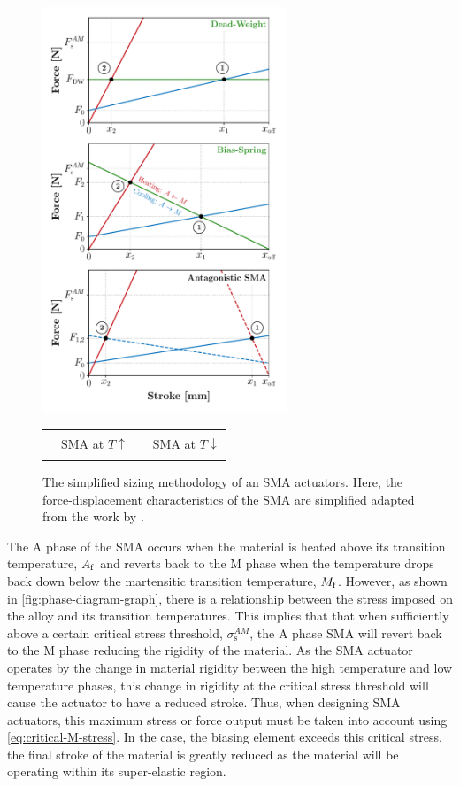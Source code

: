 \begin{figure}[hbt!]
    \centering
    \includegraphics[width=0.65\textwidth]{images/chap2/simplied-sma-bias-all-wp.pdf}

    \begin{tabular}{l@{ }l l@{ }l}
      {\color{myred} \rule[2pt]{10pt}{0.5mm} } & {\footnotesize SMA at $T\uparrow$} & {\color{myblue} \rule[2pt]{10pt}{0.5mm} } & {\footnotesize SMA at $T\downarrow$}\\
    \end{tabular}
    \caption{The simplified sizing methodology of an SMA actuators. Here, the force-displacement characteristics of the SMA are simplified adapted from the work by \cite{dragoniDesignDevelopmentAdvanced2021}.}
    \label{fig:simplied-sma-bias-spring-wp}
\end{figure}

The A phase of the SMA occurs when the material is heated above its transition temperature, $A_\mathrm{f}$ and reverts back to the M phase when the temperature drops back down below the martensitic transition temperature, $M_\mathrm{f}$. However, as shown in \cref{fig:phase-diagram-graph}, there is a relationship between the stress imposed on the alloy and its transition temperatures. This implies that that when sufficiently above a certain critical stress threshold, $\sigma_\mathrm{s}^{AM}$, the A phase SMA will revert back to the M phase reducing the rigidity of the material. As the SMA actuator operates by the change in material rigidity between the high temperature and low temperature phases, this change in rigidity at the critical stress threshold will cause the actuator to have a reduced stroke. Thus, when designing SMA actuators, this maximum stress or force output must be taken into account using \cref{eq:critical-M-stress}. In the case, the biasing element exceeds this critical stress, the final stroke of the material is greatly reduced as the material will be operating within its super-elastic region.

